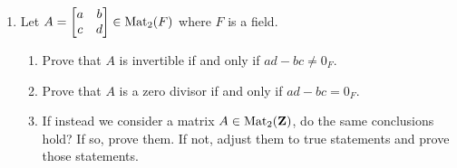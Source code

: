 \documentclass[11pt]{article}
\begin{document}
\begin{enumerate}
\item Let $A = \left[ \begin{matrix} a & b \\ c & d \end{matrix} \right] \in \operatorname{Mat}_2(F)$ where $F$ is a field. 
\begin{enumerate}
\item Prove that $A$ is invertible if and only if $ad-bc \neq 0_{F}$. 
\item Prove that $A$ is a zero divisor if and only if $ad-bc = 0_{F}$. 
\item If instead we consider a matrix $A \in \operatorname{Mat}_2(\mathbf{Z})$, do the same conclusions hold?  If so, prove them.  If not, adjust them to true statements and prove those statements.
\end{enumerate}





\end{enumerate}
\end{document}
